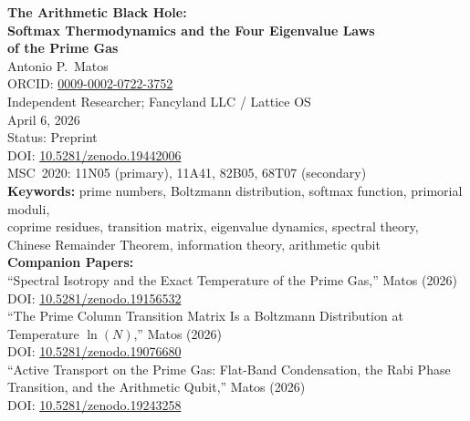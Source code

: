 \documentclass[
  11pt,
]{article}
\author{}
\date{}
\numberwithin{equation}{section}
\begin{document}
\begin{center}
{\LARGE\bfseries The Arithmetic Black Hole:\\[0.3em]
Softmax Thermodynamics and the Four Eigenvalue Laws\\[0.3em]
of the Prime Gas}\\[1.5em]

{\large Antonio P.\ Matos}\\[0.5em]
\small ORCID: \href{https://orcid.org/0009-0002-0722-3752}{0009-0002-0722-3752}\\[0.3em]
\small Independent Researcher; Fancyland LLC / Lattice OS\\[0.3em]
\small April 6, 2026\\[0.5em]
\small Status: Preprint\\[0.3em]
\small DOI: \href{https://doi.org/10.5281/zenodo.19442006}{10.5281/zenodo.19442006}\\[0.5em]

\small
MSC~2020: 11N05 (primary), 11A41, 82B05, 68T07 (secondary)\\[0.3em]
\textbf{Keywords:} prime numbers, Boltzmann distribution, softmax function, primorial moduli,\\
coprime residues, transition matrix, eigenvalue dynamics, spectral theory,\\
Chinese Remainder Theorem, information theory, arithmetic qubit\\[0.5em]

\textbf{Companion Papers:}\\[0.2em]
\small ``Spectral Isotropy and the Exact Temperature of the Prime Gas,'' Matos (2026)\\DOI: \href{https://doi.org/10.5281/zenodo.19156532}{10.5281/zenodo.19156532}\\[0.15em]
\small ``The Prime Column Transition Matrix Is a Boltzmann Distribution at Temperature $\ln(N)$,'' Matos (2026)\\DOI: \href{https://doi.org/10.5281/zenodo.19076680}{10.5281/zenodo.19076680}\\[0.15em]
\small ``Active Transport on the Prime Gas: Flat-Band Condensation, the Rabi Phase Transition, and the Arithmetic Qubit,'' Matos (2026)\\DOI: \href{https://doi.org/10.5281/zenodo.19243258}{10.5281/zenodo.19243258}
\end{center}
\end{document}
